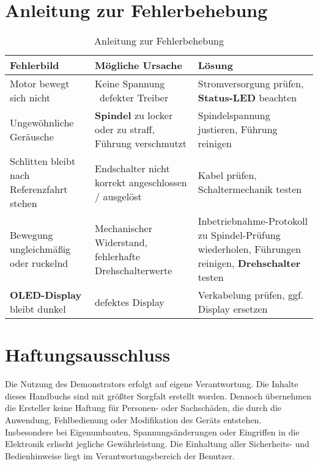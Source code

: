 \documentclass[a4paper,12pt]{report}
\begin{document}
	
	
	\chapter{Anleitung zur Fehlerbehebung}
	\begin{table}[h]
		\centering
		\begin{tabular}{|p{4cm}|p{5cm}|p{4cm}|}
			\hline
			\textbf{Fehlerbild} & \textbf{Mögliche Ursache} & \textbf{Lösung} \\ \hline
			Motor bewegt sich nicht & Keine Spannung \ defekter Treiber & Stromversorgung prüfen, \textbf{Status-LED} beachten \\ \hline
			Ungewöhnliche Geräusche & \textbf{Spindel} zu locker oder zu straff, Führung verschmutzt & Spindelspannung justieren, Führung reinigen \\ \hline
			Schlitten bleibt nach Referenzfahrt stehen & Endschalter nicht korrekt angeschlossen / ausgelöst & Kabel prüfen, Schaltermechanik testen \\ \hline
			Bewegung ungleichmäßig oder ruckelnd & Mechanischer Widerstand, fehlerhafte Drehschalterwerte & Inbetriebnahme-Protokoll zu Spindel-Prüfung wiederholen, Führungen reinigen, \textbf{Drehschalter} testen \\ \hline
			\textbf{OLED-Display} bleibt dunkel & defektes Display & Verkabelung prüfen, ggf. Display ersetzen \\ \hline

		\end{tabular}
		\caption{Anleitung zur Fehlerbehebung}
		\label{tab:fehlerbehebung}
	\end{table}
	
	
	\chapter{Haftungsausschluss}

		Die Nutzung des Demonstrators erfolgt auf eigene Verantwortung. Die Inhalte dieses Handbuchs sind mit größter Sorgfalt erstellt worden. Dennoch übernehmen die Ersteller keine Haftung für Personen- oder Sachschäden, die durch die Anwendung, Fehlbedienung oder Modifikation des Geräts entstehen. \\
		
		Insbesondere bei Eigenumbauten, Spannungsänderungen oder Eingriffen in die Elektronik erlischt jegliche Gewährleistung. Die Einhaltung aller Sicherheits- und Bedienhinweise liegt im Verantwortungsbereich der Benutzer. 
\end{document}
